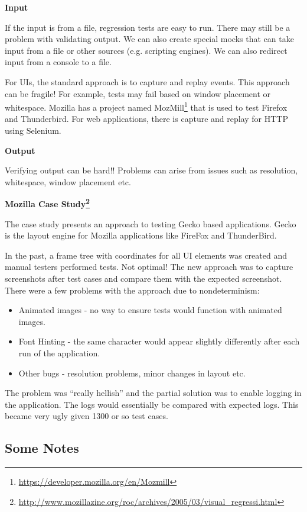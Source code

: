 \documentclass[11pt]{article}
\begin{document}
\textbf{Input}

If the input is from a file, regression tests are easy to run. There may still be a problem with validating output. We can also create special mocks that can take input from a file or other sources (e.g. scripting engines). We can also redirect input from a console to a file. 

For UIs, the standard approach is to capture and replay events. This approach can be fragile! For example, tests may fail based on window placement or whitespace. Mozilla has a project named MozMill\footnote{\url{https://developer.mozilla.org/en/Mozmill}} that is used to test Firefox and Thunderbird. For web applications, there is capture and replay for HTTP using Selenium.

\textbf{Output}

Verifying output can be hard!! Problems can arise from issues such as resolution, whitespace, window placement etc. 

\textbf{Mozilla Case Study\footnote{\url{http://www.mozillazine.org/roc/archives/2005/03/visual\_regressi.html}}}

The case study presents an approach to testing Gecko based applications. Gecko is the layout engine for Mozilla applications like FireFox and ThunderBird. 

In the past, a frame tree with coordinates for all UI elements was created and manual testers performed tests. Not optimal! The new approach was to capture screenshots after test cases and compare them with the expected screenshot. There were a few problems with the approach due to nondeterminism: 

\begin{itemize}
\item Animated images - no way to ensure tests would function with animated images.
\item Font Hinting - the same character would appear slightly differently after each run of the application.
\item Other bugs - resolution problems, minor changes in layout etc.
\end{itemize}

The problem was ``really hellish'' and the partial solution was to enable logging in the application. The logs would essentially be compared with expected logs. This became very ugly given 1300 or so test cases.

\subsection*{Some Notes}
\end{document}
